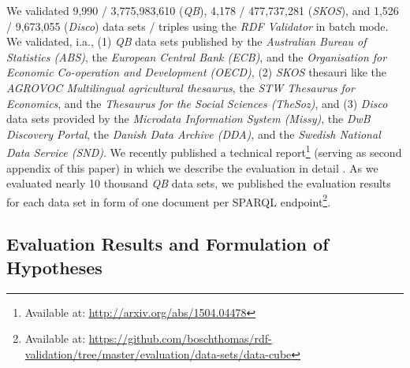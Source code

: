 \documentclass{llncs}
\begin{document}
{{We validated 
9,990 / 3,775,983,610 (\emph{QB}),
4,178 / 477,737,281 (\emph{SKOS}), and 
1,526 / 9,673,055 (\emph{Disco}) data sets / triples using the \emph{RDF Validator} in batch mode.
We validated, i.a., 
(1) \emph{QB} data sets published by the \emph{Australian Bureau of Statistics (ABS)},
the \emph{European Central Bank (ECB)}, and the
\emph{Organisation for Economic Co-operation and Development (OECD)},
(2) \emph{SKOS} thesauri like the \emph{AGROVOC Multilingual agricultural thesaurus},
the \emph{STW Thesaurus for Economics}, and the
\emph{Thesaurus for the Social Sciences (TheSoz)}, and
(3) \emph{Disco} data sets provided by the \emph{Microdata Information System (Missy)}, 
the \emph{DwB Discovery Portal}, the
\emph{Danish Data Archive (DDA)}, and the
\emph{Swedish National Data Service (SND)}.
We recently published a technical report\footnote{\label{technical-report-2}Available at: \url{http://arxiv.org/abs/1504.04478}} (serving as second appendix of this paper) 
in which we describe the evaluation in detail \cite{BoschZapilkoWackerowEckert2015-2}. 
As we evaluated nearly 10 thousand \emph{QB} data sets, we published the evaluation results for each data set in form of one document per SPARQL endpoint\footnote{Available at: \url{https://github.com/boschthomas/rdf-validation/tree/master/evaluation/data-sets/data-cube}}.

\subsection{Evaluation Results and Formulation of Hypotheses}


}}
\end{document}

